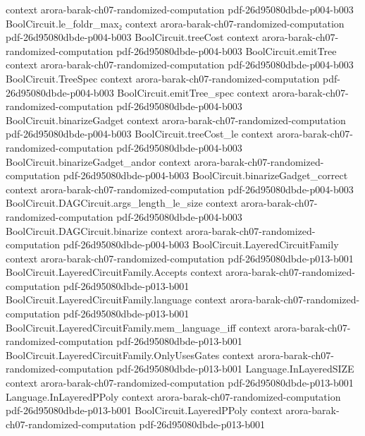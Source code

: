 \begin{theorem}
  {context}
  {arora-barak-ch07-randomized-computation}
  {pdf-26d95080dbde-p004-b003}
\proofstep
  {BoolCircuit.le_foldr_max₂}
  {context}
  {arora-barak-ch07-randomized-computation}
  {pdf-26d95080dbde-p004-b003}
\proofstep
  {BoolCircuit.treeCost}
  {context}
  {arora-barak-ch07-randomized-computation}
  {pdf-26d95080dbde-p004-b003}
\proofstep
  {BoolCircuit.emitTree}
  {context}
  {arora-barak-ch07-randomized-computation}
  {pdf-26d95080dbde-p004-b003}
\proofstep
  {BoolCircuit.TreeSpec}
  {context}
  {arora-barak-ch07-randomized-computation}
  {pdf-26d95080dbde-p004-b003}
\proofstep
  {BoolCircuit.emitTree_spec}
  {context}
  {arora-barak-ch07-randomized-computation}
  {pdf-26d95080dbde-p004-b003}
\proofstep
  {BoolCircuit.binarizeGadget}
  {context}
  {arora-barak-ch07-randomized-computation}
  {pdf-26d95080dbde-p004-b003}
\proofstep
  {BoolCircuit.treeCost_le}
  {context}
  {arora-barak-ch07-randomized-computation}
  {pdf-26d95080dbde-p004-b003}
\proofstep
  {BoolCircuit.binarizeGadget_andor}
  {context}
  {arora-barak-ch07-randomized-computation}
  {pdf-26d95080dbde-p004-b003}
\proofstep
  {BoolCircuit.binarizeGadget_correct}
  {context}
  {arora-barak-ch07-randomized-computation}
  {pdf-26d95080dbde-p004-b003}
\proofstep
  {BoolCircuit.DAGCircuit.args_length_le_size}
  {context}
  {arora-barak-ch07-randomized-computation}
  {pdf-26d95080dbde-p004-b003}
\proofstep
  {BoolCircuit.DAGCircuit.binarize}
  {context}
  {arora-barak-ch07-randomized-computation}
  {pdf-26d95080dbde-p004-b003}
\proofstep
  {BoolCircuit.LayeredCircuitFamily}
  {context}
  {arora-barak-ch07-randomized-computation}
  {pdf-26d95080dbde-p013-b001}
\proofstep
  {BoolCircuit.LayeredCircuitFamily.Accepts}
  {context}
  {arora-barak-ch07-randomized-computation}
  {pdf-26d95080dbde-p013-b001}
\proofstep
  {BoolCircuit.LayeredCircuitFamily.language}
  {context}
  {arora-barak-ch07-randomized-computation}
  {pdf-26d95080dbde-p013-b001}
\proofstep
  {BoolCircuit.LayeredCircuitFamily.mem_language_iff}
  {context}
  {arora-barak-ch07-randomized-computation}
  {pdf-26d95080dbde-p013-b001}
\proofstep
  {BoolCircuit.LayeredCircuitFamily.OnlyUsesGates}
  {context}
  {arora-barak-ch07-randomized-computation}
  {pdf-26d95080dbde-p013-b001}
\proofstep
  {Language.InLayeredSIZE}
  {context}
  {arora-barak-ch07-randomized-computation}
  {pdf-26d95080dbde-p013-b001}
\proofstep
  {Language.InLayeredPPoly}
  {context}
  {arora-barak-ch07-randomized-computation}
  {pdf-26d95080dbde-p013-b001}
\proofstep
  {BoolCircuit.LayeredPPoly}
  {context}
  {arora-barak-ch07-randomized-computation}
  {pdf-26d95080dbde-p013-b001}

\end{theorem}
